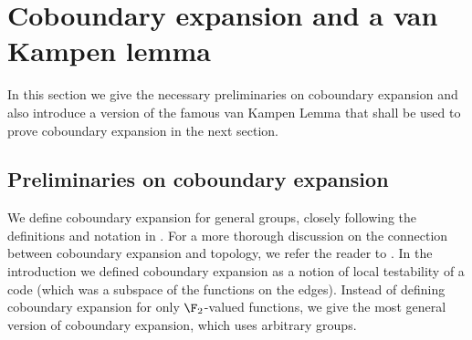 \section{Coboundary expansion and a van Kampen lemma} \label{sec:vk-lemma}
In this section we give the necessary preliminaries on coboundary expansion and also introduce a version of the famous van Kampen Lemma \cite{VanKampen1933} that shall be used to prove coboundary expansion in the next section. 
\subsection{Preliminaries on coboundary expansion}
\label{sec:prelim-coboundary}
We define coboundary expansion for general groups, closely following the definitions and notation in \cite{DiksteinD2023cbdry}. For a more thorough discussion on the connection between coboundary expansion and topology, we refer the reader to \cite{DiksteinD2023cbdry}. In the introduction we defined coboundary expansion as a notion of local testability of a code (which was a subspace of the functions on the edges). Instead of defining coboundary expansion for only $\F_2$-valued functions, we give the most general version of coboundary expansion, which uses arbitrary groups.


